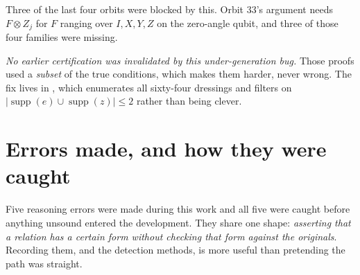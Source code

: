 \documentclass[11pt,a4paper]{article}
\theoremstyle{definition}
\begin{document}
Three of the last four orbits were blocked by this. Orbit 33's argument needs
$F \otimes Z_j$ for $F$ ranging over $I, X, Y, Z$ on the zero-angle qubit, and
three of those four families were missing.

\emph{No earlier certification was invalidated by this under-generation bug.}
Those proofs used a
\emph{subset} of the true conditions, which makes them harder, never wrong. The
fix lives in , which enumerates all sixty-four dressings
and filters on $|\operatorname{supp}(e) \cup \operatorname{supp}(z)| \le 2$
rather than being clever.

\section{Errors made, and how they were caught}
\label{sec:errors}

Five reasoning errors were made during this work and all five were caught before
anything unsound entered the development. They share one shape: \emph{asserting
that a relation has a certain form without checking that form against the
originals}. Recording them, and the detection methods, is more useful than
pretending the path was straight.
\end{document}
